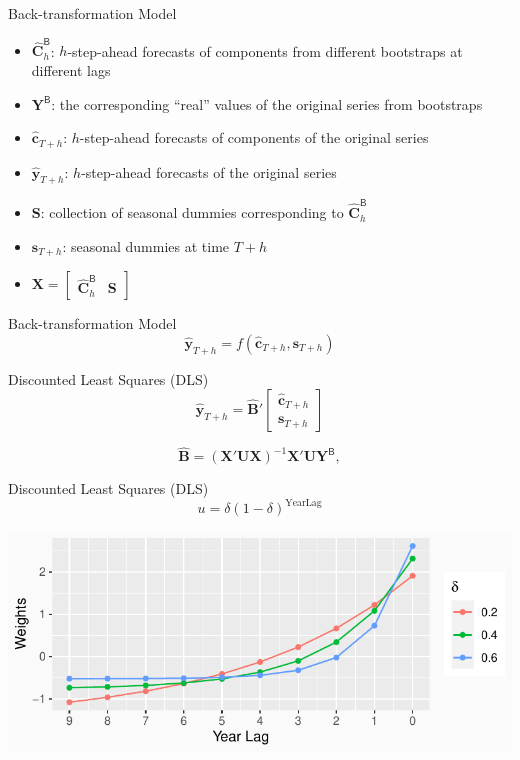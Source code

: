 \documentclass[14pt,ignorenonframetext,]{beamer}
\providecommand{\tightlist}{%
  \setlength{\itemsep}{0pt}\setlength{\parskip}{0pt}}
\begin{document}
\begin{frame}{Back-transformation Model}
\protect\hypertarget{back-transformation-model}{}
\begin{itemize}
\tightlist
\item
  \(\hat{\bm{C}}^\mathsf{B}_h\): \(h\)-step-ahead forecasts of
  components from different bootstraps at different lags
\item
  \(\bm{Y}^\mathsf{B}\): the corresponding ``real'' values of the
  original series from bootstraps
\item
  \(\hat{\bm{c}}_{T+h}\): \(h\)-step-ahead forecasts of components of
  the original series
\item
  \(\hat{\bm{y}}_{T+h}\): \(h\)-step-ahead forecasts of the original
  series
\item
  \(\bm{S}\): collection of seasonal dummies corresponding to
  \(\hat{\bm{C}}^\mathsf{B}_h\)
\item
  \(\bm{s}_{T+h}\): seasonal dummies at time \(T+h\)
\item
  \(\bm{X} = \begin{bmatrix}\hat{\bm{C}}^\mathsf{B}_h & \bm{S}\end{bmatrix}\)
\end{itemize}
\end{frame}

\begin{frame}{Back-transformation Model}
\protect\hypertarget{back-transformation-model-1}{}
\[
\hat{\bm{y}}_{T+h} = 
f(\hat{\bm{c}}_{T + h}, \bm{s}_{T+h})
\]

\begin{block}{Discounted Least Squares (DLS)}
\protect\hypertarget{discounted-least-squares-dls}{}
\[
\hat{\bm{y}}_{T+h} = 
\hat{\bm{B}}'
\begin{bmatrix}
\hat{\bm{c}}_{T + h} \\ \bm{s}_{T+h}
\end{bmatrix}
\]

\[
\hat{\bm{B}} = (\bm{X}'\bm{U}\bm{X})^{-1}\bm{X}'\bm{U}\bm{Y}^\mathsf{B}, 
\]
\end{block}
\end{frame}

\begin{frame}{Discounted Least Squares (DLS)}
\protect\hypertarget{discounted-least-squares-dls-1}{}
\[
u = \delta(1-\delta)^{\text{YearLag}}
\]

\begin{center}
\includegraphics[width=\linewidth]{plot/p_dls}
\end{center}
\end{frame}
\end{document}
